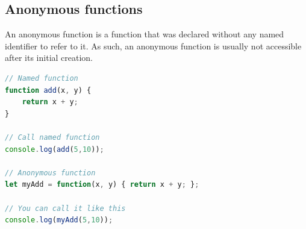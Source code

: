 \documentclass[12pt]{article}
\begin{document}
\subsection{Anonymous functions}

An anonymous function is a function that was declared without any named identifier to refer to it. As such, an anonymous function is usually not accessible after its initial creation.
 
\begin{lstlisting}[language=javascript]
// Named function
function add(x, y) {
    return x + y;
}

// Call named function
console.log(add(5,10));

// Anonymous function
let myAdd = function(x, y) { return x + y; };

// You can call it like this
console.log(myAdd(5,10));
\end{lstlisting}

 
\end{document}
